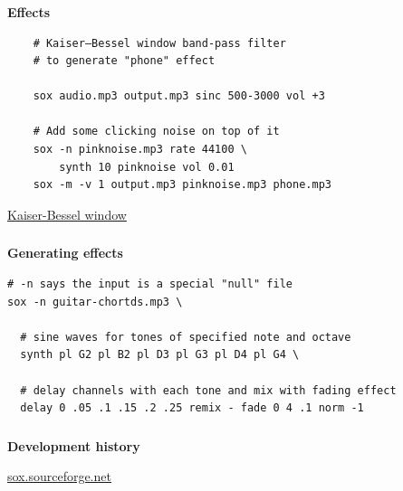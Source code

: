\documentclass[usenames,dvipsnames, 18pt, compress, aspectratio=169]{beamer}
\begin{document}
\begin{frame}[fragile]{}
    \frametitle{}
    \begin{center}
        \textbf{Effects}
        \vspace{0.2cm}

        \begin{verbatim}
    # Kaiser–Bessel window band-pass filter
    # to generate "phone" effect

    sox audio.mp3 output.mp3 sinc 500-3000 vol +3

    # Add some clicking noise on top of it
    sox -n pinknoise.mp3 rate 44100 \
        synth 10 pinknoise vol 0.01
    sox -m -v 1 output.mp3 pinknoise.mp3 phone.mp3
        \end{verbatim}

        \href{https://en.wikipedia.org/wiki/Kaiser_window}{Kaiser-Bessel window}
    \end{center}
\end{frame}


\begin{frame}[fragile]{}
    \frametitle{}
    \begin{center}
        \textbf{Generating effects}
        \vspace{0.2cm}

        \begin{verbatim}
# -n says the input is a special "null" file
sox -n guitar-chortds.mp3 \

  # sine waves for tones of specified note and octave
  synth pl G2 pl B2 pl D3 pl G3 pl D4 pl G4 \

  # delay channels with each tone and mix with fading effect
  delay 0 .05 .1 .15 .2 .25 remix - fade 0 4 .1 norm -1
        \end{verbatim}

    \end{center}
\end{frame}

\begin{frame}[fragile]{}
    \frametitle{}
    \begin{center}
        \textbf{Development history}
        \vspace{0.2cm}

        \href{http://sox.sourceforge.net/}{sox.sourceforge.net}

    \end{center}
\end{frame}
\end{document}
